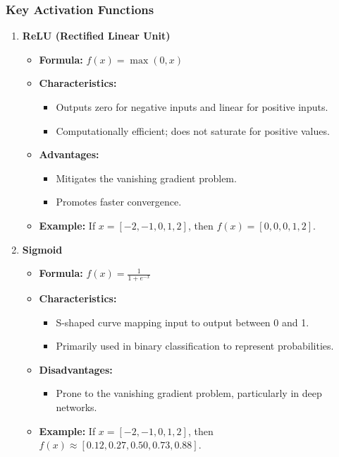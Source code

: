 \documentclass{beamer}
\begin{document}
\begin{frame}[fragile]
    \frametitle{Key Activation Functions}
    \begin{enumerate}
        \item \textbf{ReLU (Rectified Linear Unit)}
            \begin{itemize}
                \item \textbf{Formula:} $f(x) = \max(0, x)$
                \item \textbf{Characteristics:}
                    \begin{itemize}
                        \item Outputs zero for negative inputs and linear for positive inputs.
                        \item Computationally efficient; does not saturate for positive values.
                    \end{itemize}
                \item \textbf{Advantages:}
                    \begin{itemize}
                        \item Mitigates the vanishing gradient problem.
                        \item Promotes faster convergence.
                    \end{itemize}
                \item \textbf{Example:} If $x = [-2, -1, 0, 1, 2]$, then $f(x) = [0, 0, 0, 1, 2]$.
            \end{itemize}
            
        \item \textbf{Sigmoid}
            \begin{itemize}
                \item \textbf{Formula:} $f(x) = \frac{1}{1 + e^{-x}}$
                \item \textbf{Characteristics:}
                    \begin{itemize}
                        \item S-shaped curve mapping input to output between 0 and 1.
                        \item Primarily used in binary classification to represent probabilities.
                    \end{itemize}
                \item \textbf{Disadvantages:}
                    \begin{itemize}
                        \item Prone to the vanishing gradient problem, particularly in deep networks.
                    \end{itemize}
                \item \textbf{Example:} If $x = [-2, -1, 0, 1, 2]$, then $f(x) \approx [0.12, 0.27, 0.50, 0.73, 0.88]$.
            \end{itemize}


\end{enumerate}
\end{frame}
\end{document}
